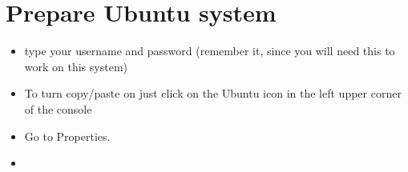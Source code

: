 \documentclass[a4paper,12pt]{book}
\begin{document}
\section{Prepare Ubuntu system}
\begin{itemize}
	\item type your username and password (remember it, since you will need this to work on this system)
	\item To turn copy/paste on just click on the Ubuntu icon in the left upper corner of the console
	\item \begin{minipage}[t]{\linewidth}
		\raggedright
		
		\medskip
		Go to Properties.
	\end{minipage}
	\item \begin{minipage}[t]{\linewidth}
		\raggedright
		

\end{minipage}
\end{itemize}
\end{document}

